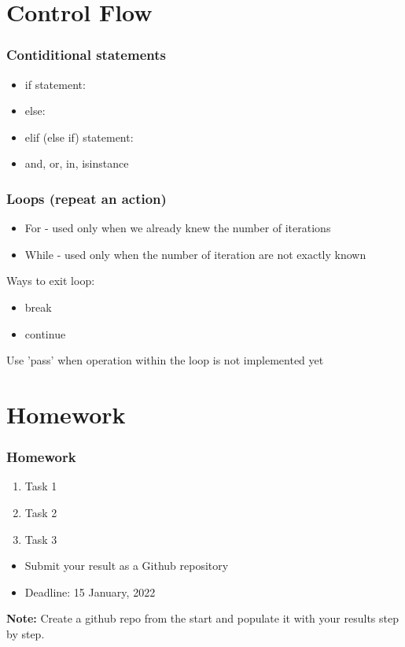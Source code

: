 \documentclass{beamer}
\begin{document}
\section{Control Flow} 

\begin{frame}
    \frametitle{Contiditional statements}
    \begin{itemize}
        \item if statement:
        \item else:
        \item elif (else if) statement:  
        \item and, or, in, isinstance
    \end{itemize}
\end{frame}

\begin{frame}
    \frametitle{Loops (repeat an action)}
    \begin{itemize}
        \item For - used only when we already knew the number of iterations
        \item While - used only when the number of iteration are not exactly known
    \end{itemize}

    Ways to exit loop:
    \begin{itemize}
        \item break
        \item continue
    \end{itemize}
    
    Use 'pass' when operation within the loop is not implemented yet
\end{frame}

\section{Homework} 

\begin{frame}
    \frametitle{Homework}
    \begin{enumerate}
        \item Task 1
        \item Task 2
        \item Task 3
    \end{enumerate}

    \vskip 2mm
    \begin{itemize}
        \item Submit your result as a Github repository
        \item Deadline: 15 January, 2022
    \end{itemize}

\vfill
\textbf{Note:} Create a github repo from the start and populate it with your results step by step.
\end{frame}
\end{document}
